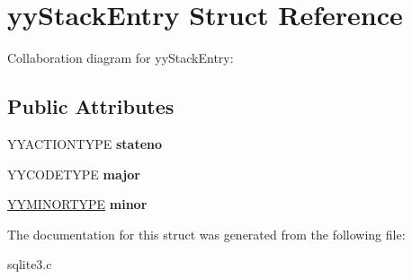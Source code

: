 \hypertarget{structyyStackEntry}{}\section{yy\+Stack\+Entry Struct Reference}
\label{structyyStackEntry}


Collaboration diagram for yy\+Stack\+Entry\+:
\subsection*{Public Attributes}
\begin{DoxyCompactItemize}
\item 
Y\+Y\+A\+C\+T\+I\+O\+N\+T\+Y\+PE {\bfseries stateno}\hypertarget{structyyStackEntry_a108164609c2e841577cc3533d8f0180d}{}\label{structyyStackEntry_a108164609c2e841577cc3533d8f0180d}

\item 
Y\+Y\+C\+O\+D\+E\+T\+Y\+PE {\bfseries major}\hypertarget{structyyStackEntry_a7624d02bcf945d48068f4c383551725c}{}\label{structyyStackEntry_a7624d02bcf945d48068f4c383551725c}

\item 
\hyperlink{unionYYMINORTYPE}{Y\+Y\+M\+I\+N\+O\+R\+T\+Y\+PE} {\bfseries minor}\hypertarget{structyyStackEntry_a024e1e64bce5945080629a2dd8d1bb4f}{}\label{structyyStackEntry_a024e1e64bce5945080629a2dd8d1bb4f}

\end{DoxyCompactItemize}


The documentation for this struct was generated from the following file\+:\begin{DoxyCompactItemize}
\item 
sqlite3.\+c\end{DoxyCompactItemize}
